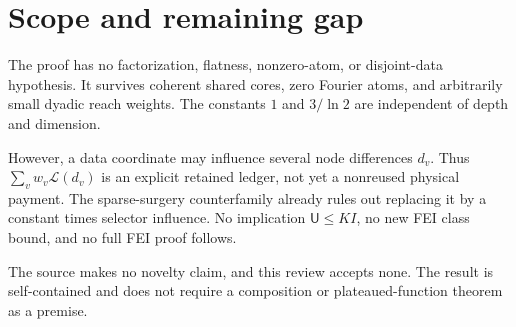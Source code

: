\documentclass[11pt]{article}
\newcommand{\cU}{\mathsf U}
\begin{document}
\section{Scope and remaining gap}

The proof has no factorization, flatness, nonzero-atom, or disjoint-data
hypothesis.  It survives coherent shared cores, zero Fourier atoms, and
arbitrarily small dyadic reach weights.  The constants $1$ and $3/\ln2$ are
independent of depth and dimension.

However, a data coordinate may influence several node differences $d_v$.
Thus $\sum_vw_v\mathcal L(d_v)$ is an explicit retained ledger, not yet a
nonreused physical payment.  The sparse-surgery counterfamily already rules
out replacing it by a constant times selector influence.  No implication
$\cU\leq K I$, no new FEI class bound, and no full FEI proof follows.

The source makes no novelty claim, and this review accepts none.  The result
is self-contained and does not require a composition or plateaued-function
theorem as a premise.
\end{document}
